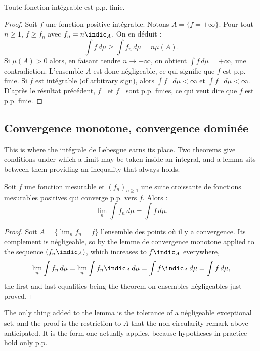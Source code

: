 \begin{theorem}
  Toute fonction intégrable est p.p. finie.
\end{theorem}

\begin{proof}
  Soit $f$ une fonction positive intégrable. Notons $A = \{f = +\infty\}$. Pour tout
  $n \geq 1$, $f \geq f_{n}$ avec $f_{n} = n \indic_{A}$. On en déduit :
  \[
    \int f \, d\mu \geq \int f_{n} \, d\mu = n \mu(A) .
  \]
  Si $\mu(A) > 0$ alors, en faisant tendre $n \to +\infty$, on obtient $\int f \,
  d\mu = +\infty$, une contradiction. L'ensemble $A$ est donc négligeable, ce qui
  signifie que $f$ est p.p. finie. Si $f$ est intégrable (of arbitrary sign), alors
  $\int f^{+} \, d\mu < \infty$ et $\int f^{-} \, d\mu < \infty$. D'après le
  résultat précédent, $f^{+}$ et $f^{-}$ sont p.p. finies, ce qui veut dire que $f$
  est p.p. finie.
\end{proof}

\subsection{Convergence monotone, convergence dominée}

This is where the intégrale de Lebesgue earns its place. Two theorems give
conditions under which a limit may be taken inside an integral, and a lemma sits
between them providing an inequality that always holds.

\begin{theorem}
  Soit $f$ une fonction mesurable et $(f_{n})_{n \geq 1}$ une suite croissante de
  fonctions mesurables positives qui converge p.p. vers $f$. Alors :
  \[
    \lim_{n} \int f_{n} \, d\mu = \int f \, d\mu .
  \]
\end{theorem}

\begin{proof}
  Soit $A = \{\lim_{n} f_{n} = f\}$ l'ensemble des points où il y a convergence. Its
  complement is négligeable, so by the lemme de convergence monotone applied to the
  sequence $(f_{n} \indic_{A})$, which increases to $f \indic_{A}$ everywhere,
  \[
    \lim_{n} \int f_{n} \, d\mu = \lim_{n} \int f_{n} \indic_{A} \, d\mu
    = \int f \indic_{A} \, d\mu = \int f \, d\mu ,
  \]
  the first and last equalities being the theorem on ensembles négligeables just
  proved.
\end{proof}

\begin{remark}
  The only thing added to the lemma is the tolerance of a négligeable exceptional
  set, and the proof is the restriction to $A$ that the non-circularity remark above
  anticipated. It is the form one actually applies, because hypotheses in practice
  hold only p.p.
\end{remark}

